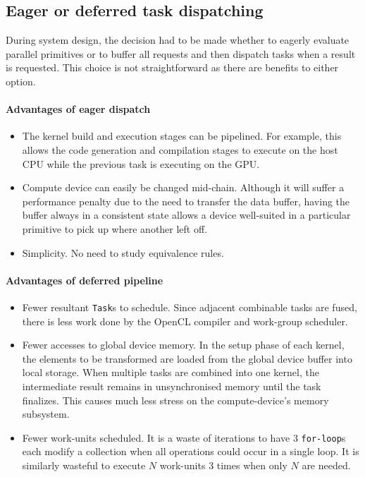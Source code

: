 \subsection{Eager or deferred task dispatching}
During system design, the decision had to be made whether to eagerly evaluate parallel primitives or to buffer all requests and then dispatch tasks when a result is requested. This choice is not straightforward as there are benefits to either option.

\paragraph*{Advantages of eager dispatch}
\begin{itemize}
\item The kernel build and execution stages can be pipelined. For example, this allows the code generation and compilation stages to execute on the host \ac{CPU} while the previous task is executing on the \ac{GPU}.

\item Compute device can easily be changed mid-chain. Although it will suffer a performance penalty due to the need to transfer the data buffer, having the buffer always in a consistent state allows a device well-suited in a particular primitive to pick up where another left off.

\item Simplicity. No need to study equivalence rules.
\end{itemize}

\paragraph*{Advantages of deferred pipeline}
\begin{itemize}
\item Fewer resultant \verb|Task|s to schedule. Since adjacent combinable tasks are fused, there is less work done by the \ac{OpenCL} compiler and work-group scheduler.

\item Fewer accesses to global device memory. In the setup phase of each kernel, the elements to be transformed are loaded from the global device buffer into local storage. When multiple tasks are combined into one kernel, the intermediate result remains in unsynchronised memory until the task finalizes. This causes much less stress on the compute-device's memory subsystem.

\item Fewer work-units scheduled. It is a waste of iterations to have $3$ \verb|for-loop|s each modify a collection when all operations could occur in a single loop. It is similarly wasteful to execute $N$ work-units $3$ times when only $N$ are needed.
\end{itemize}

